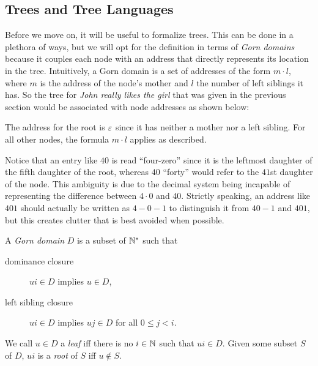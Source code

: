 \subsection{Trees and Tree Languages}

Before we move on, it will be useful to formalize trees.
This can be done in a plethora of ways, but we will opt for the definition in terms of \emph{Gorn domains} \citep{Gorn67} because it couples each node with an address that directly represents its location in the tree.
Intuitively, a Gorn domain is a set of addresses of the form $m \cdot l$, where $m$ is the address of the node's mother and $l$ the number of left siblings it has.
So the tree for \emph{John really likes the girl} that was given in the previous section would be associated with node addresses as shown below:
%
\begin{center}
    
\end{center}
%
The address for the root is $\varepsilon$ since it has neither a mother nor a left sibling.
For all other nodes, the formula $m \cdot l$ applies as described.

Notice that an entry like $40$ is read ``four-zero'' since it is the leftmost daughter of the fifth daughter of the root, whereas $40$ ``forty'' would refer to the $41$st daughter of the node.
This ambiguity is due to the decimal system being incapable of representing the difference between $4 \cdot 0$ and $40$.
Strictly speaking, an address like $401$ should actually be written as $4-0-1$ to distinguish it from $40-1$ and $401$, but this creates clutter that is best avoided when possible.
%
\begin{definition}
    A \emph{Gorn domain} $D$ is a subset of $\mathbb{N}^*$ such that
    \begin{description}
        \item[dominance closure] $ui \in D$ implies $u \in D$,
        \item[left sibling closure] $ui \in D$ implies $uj \in D$ for all $0 \leq j < i$.
    \end{description}
    We call $u \in D$ a \emph{leaf} iff there is no $i \in \mathbb{N}$ such that $ui \in D$.
    Given some subset $S$ of $D$, $ui$ is a \emph{root} of $S$ iff $u \notin S$.
\end{definition}

